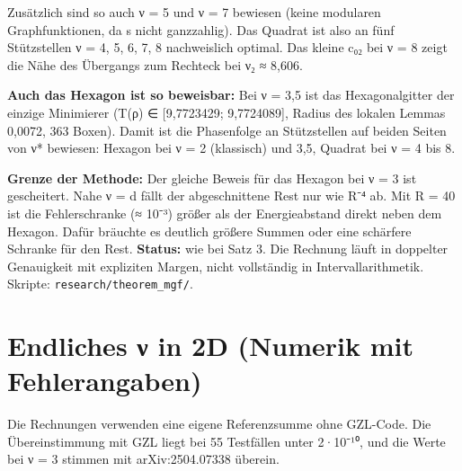 Zusätzlich sind so auch ν = 5 und ν = 7 bewiesen (keine modularen Graphfunktionen, da s nicht ganzzahlig). Das Quadrat ist also an fünf Stützstellen ν = 4, 5, 6, 7, 8 nachweislich optimal. Das kleine c₀₂ bei ν = 8 zeigt die Nähe des Übergangs zum Rechteck bei ν₂ ≈ 8,606.

\textbf{Auch das Hexagon ist so beweisbar:} Bei ν = 3,5 ist das Hexagonalgitter der einzige Minimierer (T(ρ) ∈ {[}9,7723429; 9,7724089{]}, Radius des lokalen Lemmas 0,0072, 363 Boxen). Damit ist die Phasenfolge an Stützstellen auf beiden Seiten von ν* bewiesen: Hexagon bei ν = 2 (klassisch) und 3,5, Quadrat bei ν = 4 bis 8.

\textbf{Grenze der Methode:} Der gleiche Beweis für das Hexagon bei ν = 3 ist gescheitert. Nahe ν = d fällt der abgeschnittene Rest nur wie R⁻⁴ ab. Mit R = 40 ist die Fehlerschranke (≈ 10⁻³) größer als der Energieabstand direkt neben dem Hexagon. Dafür bräuchte es deutlich größere Summen oder eine schärfere Schranke für den Rest. \textbf{Status:} wie bei Satz 3. Die Rechnung läuft in doppelter Genauigkeit mit expliziten Margen, nicht vollständig in Intervallarithmetik. Skripte: \texttt{research/theorem\_mgf/}.

\section{Endliches ν in 2D (Numerik mit Fehlerangaben)}

Die Rechnungen verwenden eine eigene Referenzsumme ohne GZL-Code. Die Übereinstimmung mit GZL liegt bei 55 Testfällen unter 2·10⁻¹⁰, und die Werte bei ν = 3 stimmen mit arXiv:2504.07338 überein.

